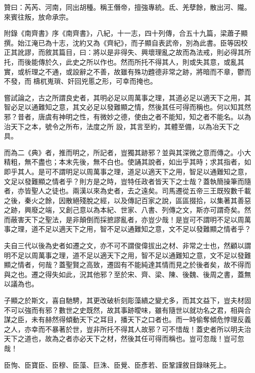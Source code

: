 \begin{pinyinscope}
 贊曰：芮芮、河南，同出胡種。稱王僭帝，擅強專統。氐、羌孽餘，散出河、隴。來賓往叛，放命承宗。



 附錄《南齊書》序《南齊書》，八紀，十一志，四十列傳，合五十九篇，梁蕭子顯撰。始江淹已為十志，沈約又為《齊紀》，而子顯自表武帝，別為此書。臣等因校正其訛謬，而敘其篇目，曰：將以是非得失、興壞理亂之故而為法戒，則必得其所托，而後能傳於久，此史之所以作也。然而所托不得其人，則或失其意，或亂其實，或析理之不通，或設辭之不善，故雖有殊功韙德非常之跡，將暗而不章，鬱而不發，而檮杌嵬瑣、奸回兇慝之形，可幸而掩也。



 嘗試論之，古之所謂良史者，其明必足以周萬事之理，其道必足以適天下之用，其智必足以通難知之意，其文必足以發難顯之情，然後其任可得而稱也。何以知其然邪？昔者，唐虞有神明之性，有微妙之德，使由之者不能知，知之者不能名。以為治天下之本，號令之所布，法度之所
 設，其言至約，其體至備，以為冶天下之具。



 而為二《典》者，推而明之，所記者，豈獨其跡邪？並與其深微之意而傳之。小大精粗，無不盡也；本末先後，無不白也。使誦其說者，如出乎其時；求其指者，如即乎其人。是可不謂明足以周萬事之理，道足以適天下之用，智足以通難知之意，文足以發難顯之情者乎？則方是之時，豈特任政者皆天下之士哉？蓋執簡操筆而隨者，亦皆聖人之徒也。兩漢以來為史者，去之遠矣。司馬遷從五帝三王既歿數千載之後，秦火之餘，因散絕殘脫之經，以及傳記百家之說，區區掇拾，以集著其善惡之跡，興廢之端，又創己意以為本紀、世家、八書、列傳之文，斯亦可謂奇矣。然而蔽害天下之聖法，是非顛倒而採摭謬亂者，亦豈少哉！是豈可不謂明不足以周萬事之理，道不足以適天下之用，智不足以通難知之意，文不足以發難顯之情者乎？



 夫自三代以後為史者如遷之文，亦不可不謂俊偉拔出之材、非常之士也，然顧以謂明不足以周萬事之理，道不足以適天下之用，智不足以通難知之意，文不足以發難顯之情者，何哉？蓋聖賢之高致，遷固有不能純達其情而見之於後者矣，故不得而與之也。遷之得失如此，況其他邪？至於宋、齊、梁、陳、後魏、後周之書，蓋無以議為也。



 子顯之於斯文，喜自馳騁，其更改破析刻彫藻繢之變尤多，而其文益下，豈夫材固不可以強而有邪？數世之史既然，故其事跡曖味，雖有隨世以就功名之君，相與合謀之臣，未有赫然得傾動天下之耳目，播天下之口者也。而一時偷奪傾危悖理反義之人，亦幸而不暴著於世，豈非所托不得其人故邪？可不惜哉！蓋史者所以明夫治天下之道也，故為之者亦必天下之材，然後其任可得而稱也。豈可忽哉！豈可忽哉！



 臣恂、臣寶臣、臣穆、臣藻、巨洙、臣覺、臣彥若、臣鞏謹敘目錄昧死上。



\end{pinyinscope}